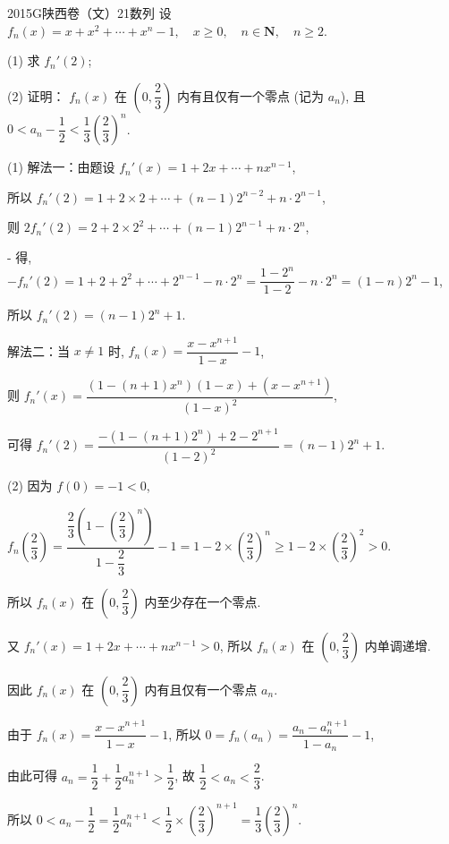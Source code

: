 
\begin{problem}{2015}{G}{陕西卷（文）}{21}{数列}
设 $f_n(x) = x+x^2+\cdots+x^n-1, \quad x \ge 0, \quad n \in \mathbf{N}, \quad n \ge 2$.

(1) 求 $f_n'(2)$;

(2) 证明： $f_n(x)$ 在 $\left(0, \dfrac{2}{3}\right)$ 内有且仅有一个零点 (记为 $a_n$), 且 $0 < a_n-\dfrac{1}{2} < \dfrac{1}{3}\left(\dfrac{2}{3}\right)^n$.
\end{problem}

\begin{solutions}
(1) 解法一：由题设 $f_n'(x)=1+2x+\cdots+nx^{n-1}$,

所以 $f_n'(2)=1+2 \times 2+\cdots+(n-1)2^{n-2}+n \cdot 2^{n-1}$, 

则 $2f_n'(2)=2+2 \times 2^2+\cdots+(n-1)2^{n-1}+n \cdot 2^n$, 

 -  得, $-f_n'(2)=1+2+2^2+\cdots+2^{n-1}-n \cdot 2^n = \dfrac{1-2^n}{1-2}-n \cdot 2^n = (1-n)2^n-1$,

所以 $f_n'(2)=(n-1)2^n+1$.

解法二：当 $x \ne 1$ 时, $f_n(x)=\dfrac{x-x^{n+1}}{1-x}-1$,

则 $f_n'(x)=\dfrac{(1-(n+1)x^n)(1-x)+(x-x^{n+1})}{(1-x)^2}$,

可得 $f_n'(2)=\dfrac{-(1-(n+1)2^n)+2-2^{n+1}}{(1-2)^2}=(n-1)2^n+1$.

(2) 因为 $f(0)=-1<0$,

$f_n\left(\dfrac{2}{3}\right)=\dfrac{\dfrac{2}{3}\left(1-\left(\dfrac{2}{3}\right)^n\right)}{1-\dfrac{2}{3}}-1=1-2 \times \left(\dfrac{2}{3}\right)^n \ge 1-2 \times \left(\dfrac{2}{3}\right)^2 > 0$.

所以 $f_n(x)$ 在 $\left(0, \dfrac{2}{3}\right)$ 内至少存在一个零点.

又 $f_n'(x)=1+2x+\cdots+nx^{n-1}>0$, 所以 $f_n(x)$ 在 $\left(0, \dfrac{2}{3}\right)$ 内单调递增.

因此 $f_n(x)$ 在 $\left(0, \dfrac{2}{3}\right)$ 内有且仅有一个零点 $a_n$.

由于 $f_n(x)=\dfrac{x-x^{n+1}}{1-x}-1$, 所以 $0=f_n(a_n)=\dfrac{a_n-a_n^{n+1}}{1-a_n}-1$,

由此可得 $a_n=\dfrac{1}{2}+\dfrac{1}{2}a_n^{n+1} > \dfrac{1}{2}$, 故 $\dfrac{1}{2} < a_n < \dfrac{2}{3}$.

所以 $0 < a_n-\dfrac{1}{2}=\dfrac{1}{2}a_n^{n+1} < \dfrac{1}{2} \times \left(\dfrac{2}{3}\right)^{n+1} = \dfrac{1}{3}\left(\dfrac{2}{3}\right)^n$.
\end{solutions}